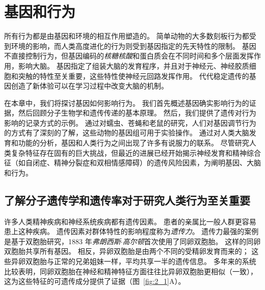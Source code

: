 \chapter{基因和行为} \label{chap:chap2}

所有行为都是由基因和环境的相互作用塑造的。
简单动物的大多数刻板行为都受到环境的影响，而人类高度进化的行为则受到基因指定的先天特性的限制。
基因不直接控制行为，但基因编码的\textit{核糖核酸}和蛋白质会在不同时间和多个层面发挥作用，影响大脑。
基因指定了组装大脑的发育程序，并且对于神经元、神经胶质细胞和突触的特性至关重要，这些特性使神经元回路发挥作用。
代代稳定遗传的基因创造了新体验可以在学习过程中改变大脑的机制。


在本章中，我们将探讨基因如何影响行为。
我们首先概述基因确实影响行为的证据，然后回顾分子生物学和遗传传递的基本原理。
然后，我们提供了遗传对行为影响的记录方式的示例。
通过对蠕虫、苍蝇和老鼠的研究，人们对基因调节行为的方式有了深刻的了解，这些动物的基因组可用于实验操作。
通过对人类大脑发育和功能的分析，基因和人类行为之间出现了许多有说服力的联系。
尽管研究人类复杂特征存在固有的巨大挑战，但最近的进展已经开始揭示神经发育和精神综合征（如自闭症、精神分裂症和双相情感障碍）的遗传风险因素，为阐明基因、大脑和行为。



\section{了解分子遗传学和遗传率对于研究人类行为至关重要}

许多人类精神疾病和神经系统疾病都有遗传因素。
患者的亲属比一般人群更容易患上这种疾病。
遗传因素对群体特性的影响程度称为\textit{遗传力}。
遗传力最强的案例是基于双胞胎研究，1883 年\textit{弗朗西斯$\cdot$高尔顿}首次使用了同卵双胞胎。
这样的同卵双胞胎共享所有基因。
相反，异卵双胞胎是由两个不同的受精卵发育而来的；
这些异卵双胞胎与正常的兄弟姐妹一样，平均共享一半的遗传信息。
多年来的系统比较表明，同卵双胞胎在神经和精神特征方面往往比异卵双胞胎更相似（一致），这为这些特征的可遗传成分提供了证据（图~\ref{fig:2_1}A）。


